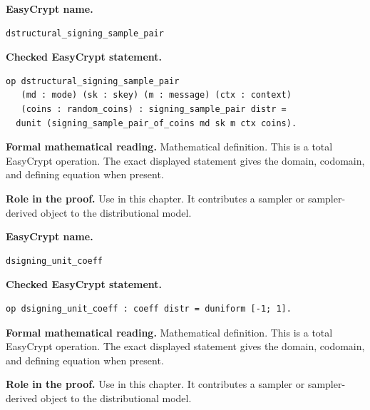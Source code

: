 \begin{formaldefinition}
\noindent\textbf{EasyCrypt name.}
\begin{lstlisting}[language=EasyCrypt,basicstyle=\ttfamily\scriptsize]
dstructural_signing_sample_pair
\end{lstlisting}
\noindent\textbf{Checked EasyCrypt statement.}
\begin{lstlisting}[language=EasyCrypt,basicstyle=\ttfamily\scriptsize]
op dstructural_signing_sample_pair
   (md : mode) (sk : skey) (m : message) (ctx : context)
   (coins : random_coins) : signing_sample_pair distr =
  dunit (signing_sample_pair_of_coins md sk m ctx coins).
\end{lstlisting}
\noindent\textbf{Formal mathematical reading.}
Mathematical definition. This is a total EasyCrypt operation.  The exact displayed statement gives the domain, codomain, and defining equation when present.

\noindent\textbf{Role in the proof.}
Use in this chapter. It contributes a sampler or sampler-derived object to the distributional model.

\end{formaldefinition}

\begin{formaldefinition}
\noindent\textbf{EasyCrypt name.}
\begin{lstlisting}[language=EasyCrypt,basicstyle=\ttfamily\scriptsize]
dsigning_unit_coeff
\end{lstlisting}
\noindent\textbf{Checked EasyCrypt statement.}
\begin{lstlisting}[language=EasyCrypt,basicstyle=\ttfamily\scriptsize]
op dsigning_unit_coeff : coeff distr = duniform [-1; 1].
\end{lstlisting}
\noindent\textbf{Formal mathematical reading.}
Mathematical definition. This is a total EasyCrypt operation.  The exact displayed statement gives the domain, codomain, and defining equation when present.

\noindent\textbf{Role in the proof.}
Use in this chapter. It contributes a sampler or sampler-derived object to the distributional model.

\end{formaldefinition}

